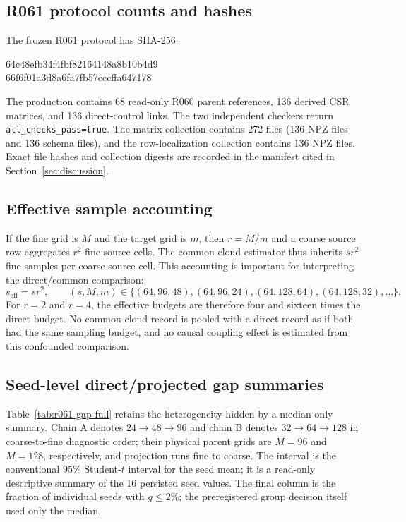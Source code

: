 \subsection{R061 protocol counts and hashes}

The frozen R061 protocol has SHA-256:
\begin{center}
\ttfamily\small
64c48efb34f4fbf82164148a8b10b4d9\\
66f6f01a3d8a6fa7fb57cccffa647178
\end{center}
The production contains 68 read-only R060 parent references, 136 derived CSR
matrices, and 136 direct-control links.  The two independent checkers return
\texttt{all\_checks\_pass=true}.  The matrix collection contains 272 files
(136 NPZ files and 136 schema files), and the row-localization collection
contains 136 NPZ files.  Exact file hashes and collection digests are recorded
in the manifest cited in Section~\ref{sec:discussion}.

\subsection{Effective sample accounting}

If the fine grid is $M$ and the target grid is $m$, then $r=M/m$ and a coarse
source row aggregates $r^2$ fine source cells.  The common-cloud estimator thus
inherits $s r^2$ fine samples per coarse source cell.  This accounting is
important for interpreting the direct/common comparison:
\begin{equation}
 s_{\mathrm{eff}}=s r^2,
 \qquad
 (s,M,m)\in\{(64,96,48),(64,96,24),(64,128,64),(64,128,32),\ldots\}.
\end{equation}
For $r=2$ and $r=4$, the effective budgets are therefore four and sixteen times
the direct budget.  No common-cloud record is pooled with a direct record as if
both had the same sampling budget, and no causal coupling effect is estimated
from this confounded comparison.

\subsection{Seed-level direct/projected gap summaries}

Table~\ref{tab:r061-gap-full} retains the heterogeneity hidden by a
median-only summary.  Chain A denotes $24\to48\to96$ and chain B denotes
$32\to64\to128$ in coarse-to-fine diagnostic order; their physical parent
grids are $M=96$ and $M=128$, respectively, and projection runs fine to coarse.
The interval is the conventional 95\% Student-$t$ interval
for the seed mean; it is a read-only descriptive summary of the 16 persisted
seed values.  The final column is the fraction of individual seeds with
$g\leq2\%$; the preregistered group decision itself used only the median.

